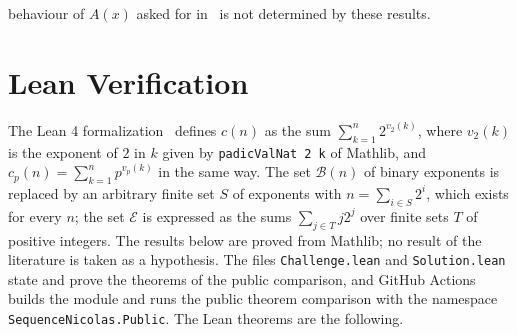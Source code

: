 \documentclass[11pt]{amsart}
\theoremstyle{definition}
\begin{document}
behaviour of $A(x)$ asked for in~\cite{nicolas2005open} is not determined by these results.

\section{Lean Verification}\label{sec:lean}
The Lean 4 formalization~\cite{vega2026sequencelean} defines $c(n)$ as the sum $\sum_{k=1}^{n}2^{v_2(k)}$, where $v_2(k)$ is the exponent of $2$ in $k$ given by \texttt{padicValNat 2 k} of Mathlib, and $c_p(n)=\sum_{k=1}^{n}p^{v_p(k)}$ in the same way. The set $\mathcal{B}(n)$ of binary exponents is replaced by an arbitrary finite set $S$ of exponents with $n=\sum_{i\in S}2^i$, which exists for every $n$; the set $\mathcal{E}$ is expressed as the sums $\sum_{j\in T}j2^j$ over finite sets $T$ of positive integers. The results below are proved from Mathlib; no result of the literature is taken as a hypothesis. The files \texttt{Challenge.lean} and \texttt{Solution.lean} state and prove the theorems of the public comparison, and GitHub Actions builds the module and runs the public theorem comparison with the namespace \texttt{SequenceNicolas.Public}. The Lean theorems are the following.
\end{document}
